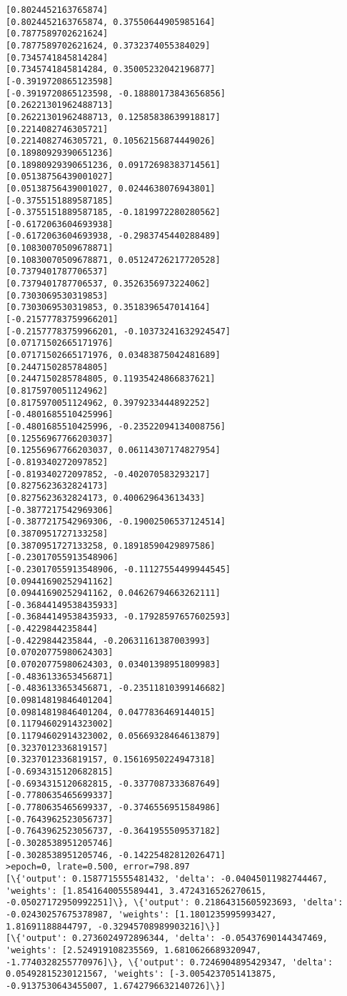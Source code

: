 \documentclass[11pt]{article}
\begin{document}
\begin{Verbatim}[commandchars=\\\{\}]
[0.8024452163765874]
[0.8024452163765874, 0.37550644905985164]
[0.7877589702621624]
[0.7877589702621624, 0.3732374055384029]
[0.7345741845814284]
[0.7345741845814284, 0.35005232042196877]
[-0.3919720865123598]
[-0.3919720865123598, -0.18880173843656856]
[0.26221301962488713]
[0.26221301962488713, 0.12585838639918817]
[0.2214082746305721]
[0.2214082746305721, 0.10562156874449026]
[0.18980929390651236]
[0.18980929390651236, 0.09172698383714561]
[0.05138756439001027]
[0.05138756439001027, 0.0244638076943801]
[-0.3755151889587185]
[-0.3755151889587185, -0.1819972280280562]
[-0.6172063604693938]
[-0.6172063604693938, -0.2983745440288489]
[0.10830070509678871]
[0.10830070509678871, 0.05124726217720528]
[0.7379401787706537]
[0.7379401787706537, 0.3526356973224062]
[0.7303069530319853]
[0.7303069530319853, 0.3518396547014164]
[-0.21577783759966201]
[-0.21577783759966201, -0.10373241632924547]
[0.07171502665171976]
[0.07171502665171976, 0.03483875042481689]
[0.2447150285784805]
[0.2447150285784805, 0.11935424866837621]
[0.8175970051124962]
[0.8175970051124962, 0.3979233444892252]
[-0.4801685510425996]
[-0.4801685510425996, -0.23522094134008756]
[0.12556967766203037]
[0.12556967766203037, 0.06114307174827954]
[-0.819340272097852]
[-0.819340272097852, -0.402070583293217]
[0.8275623632824173]
[0.8275623632824173, 0.400629643613433]
[-0.3877217542969306]
[-0.3877217542969306, -0.19002506537124514]
[0.3870951727133258]
[0.3870951727133258, 0.18918590429897586]
[-0.23017055913548906]
[-0.23017055913548906, -0.11127554499944545]
[0.09441690252941162]
[0.09441690252941162, 0.04626794663262111]
[-0.36844149538435933]
[-0.36844149538435933, -0.17928597657602593]
[-0.4229844235844]
[-0.4229844235844, -0.20631161387003993]
[0.07020775980624303]
[0.07020775980624303, 0.03401398951809983]
[-0.4836133653456871]
[-0.4836133653456871, -0.23511810399146682]
[0.09814819846401204]
[0.09814819846401204, 0.0477836469144015]
[0.11794602914323002]
[0.11794602914323002, 0.05669328464613879]
[0.3237012336819157]
[0.3237012336819157, 0.15616950224947318]
[-0.6934315120682815]
[-0.6934315120682815, -0.3377087333687649]
[-0.7780635465699337]
[-0.7780635465699337, -0.3746556951584986]
[-0.7643962523056737]
[-0.7643962523056737, -0.3641955509537182]
[-0.3028538951205746]
[-0.3028538951205746, -0.14225482812026471]
>epoch=0, lrate=0.500, error=798.897
[\{'output': 0.1587715555481432, 'delta': -0.04045011982744467, 'weights': [1.8541640055589441, 3.4724316526270615, -0.05027172950992251]\}, \{'output': 0.21864315605923693, 'delta': -0.02430257675378987, 'weights': [1.1801235995993427, 1.81691188844797, -0.32945708989903216]\}]
[\{'output': 0.2736024972896344, 'delta': -0.05437690144347469, 'weights': [2.524919108235569, 1.6810626689320947, -1.7740328255770976]\}, \{'output': 0.7246904895429347, 'delta': 0.05492815230121567, 'weights': [-3.0054237051413875, -0.9137530643455007, 1.6742796632140726]\}]

    \end{Verbatim}


    
    
    
    
\end{document}
